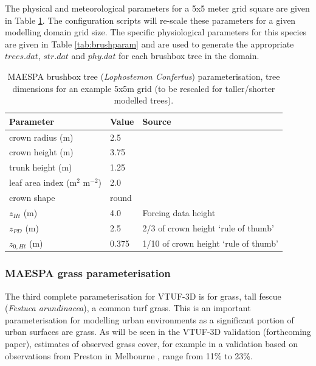 \documentclass[preprint,12pt,authoryear]{elsarticle}
\begin{document}
The physical and meteorological parameters for a 5x5 meter grid square are given in Table \ref{tab:brushscaled}. The configuration scripts will re-scale these parameters for a given modelling domain grid size. The specific physiological parameters for this species are given in Table \ref{tab:brushparam} and are used to generate the appropriate $trees.dat$, $str.dat$ and $phy.dat$ for each brushbox tree in the domain.



\begin{center}
\begin{table}[!htbp]
\caption{MAESPA brushbox tree (\textit{Lophostemon Confertus}) parameterisation, tree dimensions for an example 5x5m grid (to be rescaled for taller/shorter modelled trees).\label{tab:brushscaled}} 
\begin{tabular}{ |  l | l | l |}
\hline \textbf{Parameter} & \textbf{Value}& \textbf{Source}   \\ 
\hline
 crown radius (m) & 2.5 &\cite{Coutts2016}\\ \hline
   crown height (m) & 3.75&\cite{Coutts2016} \\ \hline
 trunk height (m) & 1.25&\cite{Coutts2016} \\ \hline
  leaf area index (m$^{2}$ m$^{-2}$)&2.0&\cite{Wright2000} \\ \hline
 crown shape & round &\\ \hline
$z_{Ht}$ (m)&4.0&Forcing data height \\ \hline
$z_{PD}$ (m) &2.5 & 2/3 of crown height `rule of thumb' \citep{Grimmond1999}\\ \hline
$z_{0,Ht}$ (m) &0.375 & 1/10 of crown height `rule of thumb' \citep{Grimmond1999}\\ \hline
\end{tabular} 
\end{table}
\end{center}



\subsubsection{MAESPA grass parameterisation}
The third complete parameterisation for VTUF-3D is for grass, tall fescue (\textit{Festuca arundinacea}), a common turf grass. This is an important parameterisation for modelling urban environments as a significant portion of urban surfaces are grass. As will be seen in the VTUF-3D validation (forthcoming paper), estimates of observed grass cover, for example in a validation based on observations from Preston in Melbourne \citep{Coutts2007,Nury2015}, range from 11\% to 23\%. 
\end{document}
